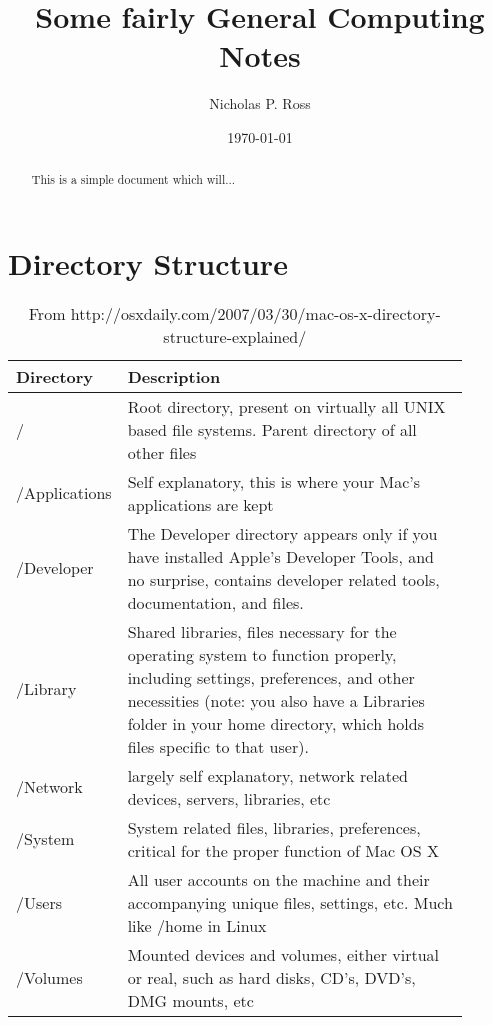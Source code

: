 \documentclass[11pt]{article}
\begin{document}
\title{Some fairly General Computing Notes}
\author{Nicholas P. Ross}
\date{\today}
\maketitle


\begin{abstract}
This is a simple document which will... 
\end{abstract}


\section{Directory Structure}

\begin{table}[h!]
  \caption{From http://osxdaily.com/2007/03/30/mac-os-x-directory-structure-explained/}
  \label{tab:the_lines}
  \begin{center}
    \begin{tabular}{p{0.13\linewidth}p{0.77\linewidth}} 
      \hline
      \hline
      Directory  &	Description \\
      \hline
      / 	& Root directory, present on virtually all UNIX based file systems. Parent directory of all other files\\
      /Applications &	Self explanatory, this is where your Mac’s applications are kept\\
      /Developer &	The Developer directory appears only if you have installed Apple’s Developer Tools, and no surprise, contains developer related tools, documentation, and files.\\
      /Library &	Shared libraries, files necessary for the operating system to function properly, including settings, preferences, and other necessities (note: you also have a Libraries folder in your home directory, which holds files specific to that user).\\
      /Network &	largely self explanatory, network related devices, servers, libraries, etc\\
      /System &	System related files, libraries, preferences, critical for the proper function of Mac OS X\\
      /Users &	All user accounts on the machine and their accompanying unique files, settings, etc. Much like /home in Linux\\
      /Volumes &	Mounted devices and volumes, either virtual or real, such as hard disks, CD’s, DVD’s, DMG mounts, etc\\

\end{tabular}
\end{center}
\end{table}
\end{document}
